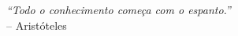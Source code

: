 \begin{epigrafe}
	\vspace*{\fill}
	\begin{flushright}
		\textit{``Todo o conhecimento começa com o espanto.''}\\
		– Aristóteles
	\end{flushright}
\end{epigrafe}
